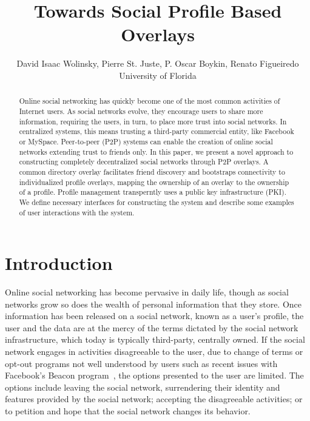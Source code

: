 \documentclass[conference]{IEEEtran}
\begin{document}
\title{Towards Social Profile Based Overlays}

\author{
David Isaac Wolinsky,
Pierre St. Juste,
P. Oscar Boykin,
Renato Figueiredo
\\
University of Florida
\\
}

\maketitle

\begin{abstract}

Online social networking has quickly become one of the most common activities
of Internet users.  As social networks evolve, they encourage users to share
more information, requiring the users, in turn, to place more trust into social
networks.  In centralized systems, this means trusting a third-party commercial
entity, like Facebook or MySpace.  Peer-to-peer (P2P) systems can enable the
creation of online social networks extending trust to friends only.  In this
paper, we present a novel approach to constructing completely decentralized
social networks through P2P overlays.  A common directory overlay facilitates
friend discovery and bootstraps connectivity to individualized profile
overlays, mapping the ownership of an overlay to the ownership of a profile.
Profile management transperntly uses a public key infrastructure (PKI).   We
define necessary interfaces for constructing the system and describe some
examples of user interactions with the system.

\end{abstract}

\section{Introduction}

Online social networking has become pervasive in daily life, though as social
networks grow so does the wealth of personal information that they store.
Once information has been released on a social network, known as a user's
profile, the user and the data are at the mercy of the terms dictated by the
social network infrastructure, which today is typically third-party, centrally
owned.  If the social network engages in activities disagreeable to the user,
due to change of terms or opt-out programs not well understood by users such
as recent issues with Facebook's Beacon program~\cite{facebook_beacon}, the
options presented to the user are limited.  The options include leaving the
social network, surrendering their identity and features provided by the social
network; accepting the disagreeable activities; or to petition and hope that
the social network changes its behavior. 
\end{document}
